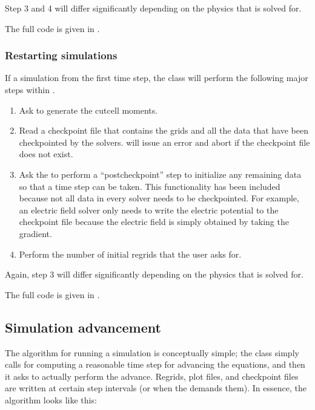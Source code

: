\documentclass[letterpaper,10pt,english]{sphinxmanual}
\begin{document}
\sphinxAtStartPar
Step 3 and 4 will differ significantly depending on the physics that is solved for.

\sphinxAtStartPar
The full code is given in .


\subsubsection{Restarting simulations}
\label{\detokenize{Source/Driver:restarting-simulations}}
\sphinxAtStartPar
If a simulation  from the first time step, the  class will perform the following major steps within .
\begin{enumerate}
%
\item {} 
\sphinxAtStartPar
Ask  to generate the cut\sphinxhyphen{}cell moments.

\item {} 
\sphinxAtStartPar
Read a checkpoint file that contains the grids and all the data that have been checkpointed by the solvers.
 will issue an error and abort if the checkpoint file does not exist.

\item {} 
\sphinxAtStartPar
Ask the  to perform a “post\sphinxhyphen{}checkpoint” step to initialize any remaining data so that a time step can be taken.
This functionality has been included because not all data in every solver needs to be checkpointed.
For example, an electric field solver only needs to write the electric potential to the checkpoint file because the electric field is simply obtained by taking the gradient.

\item {} 
\sphinxAtStartPar
Perform the number of initial regrids that the user asks for.

\end{enumerate}

\sphinxAtStartPar
Again, step 3 will differ significantly depending on the physics that is solved for.

\sphinxAtStartPar
The full code is given in .


\subsection{Simulation advancement}
\label{\detokenize{Source/Driver:simulation-advancement}}
\sphinxAtStartPar
The algorithm for running a simulation is conceptually simple; the  class simply calls  for computing a reasonable time step for advancing the equations, and then it asks  to actually perform the advance.
Regrids, plot files, and checkpoint files are written at certain step intervals (or when the  demands them).
In essence, the algorithm looks like this:
\end{document}
